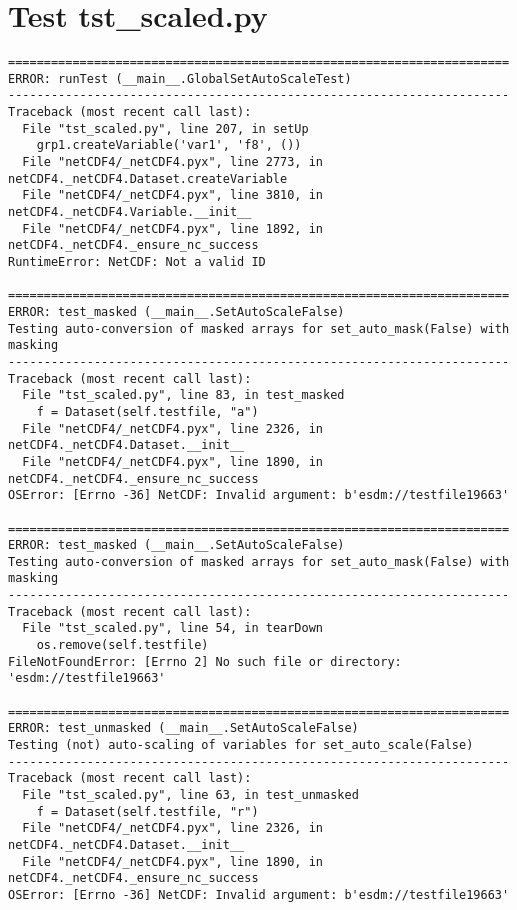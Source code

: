 \section{Test tst\_scaled.py}

\begin{verbatim}
======================================================================
ERROR: runTest (__main__.GlobalSetAutoScaleTest)
----------------------------------------------------------------------
Traceback (most recent call last):
  File "tst_scaled.py", line 207, in setUp
    grp1.createVariable('var1', 'f8', ())
  File "netCDF4/_netCDF4.pyx", line 2773, in netCDF4._netCDF4.Dataset.createVariable
  File "netCDF4/_netCDF4.pyx", line 3810, in netCDF4._netCDF4.Variable.__init__
  File "netCDF4/_netCDF4.pyx", line 1892, in netCDF4._netCDF4._ensure_nc_success
RuntimeError: NetCDF: Not a valid ID

======================================================================
ERROR: test_masked (__main__.SetAutoScaleFalse)
Testing auto-conversion of masked arrays for set_auto_mask(False) with masking
----------------------------------------------------------------------
Traceback (most recent call last):
  File "tst_scaled.py", line 83, in test_masked
    f = Dataset(self.testfile, "a")
  File "netCDF4/_netCDF4.pyx", line 2326, in netCDF4._netCDF4.Dataset.__init__
  File "netCDF4/_netCDF4.pyx", line 1890, in netCDF4._netCDF4._ensure_nc_success
OSError: [Errno -36] NetCDF: Invalid argument: b'esdm://testfile19663'

======================================================================
ERROR: test_masked (__main__.SetAutoScaleFalse)
Testing auto-conversion of masked arrays for set_auto_mask(False) with masking
----------------------------------------------------------------------
Traceback (most recent call last):
  File "tst_scaled.py", line 54, in tearDown
    os.remove(self.testfile)
FileNotFoundError: [Errno 2] No such file or directory: 'esdm://testfile19663'

======================================================================
ERROR: test_unmasked (__main__.SetAutoScaleFalse)
Testing (not) auto-scaling of variables for set_auto_scale(False)
----------------------------------------------------------------------
Traceback (most recent call last):
  File "tst_scaled.py", line 63, in test_unmasked
    f = Dataset(self.testfile, "r")
  File "netCDF4/_netCDF4.pyx", line 2326, in netCDF4._netCDF4.Dataset.__init__
  File "netCDF4/_netCDF4.pyx", line 1890, in netCDF4._netCDF4._ensure_nc_success
OSError: [Errno -36] NetCDF: Invalid argument: b'esdm://testfile19663'


\end{verbatim}
